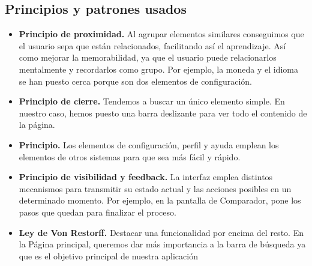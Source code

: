 \subsection{Principios y patrones usados}

\begin{itemize}

      \item \textbf{Principio de proximidad.} Al agrupar elementos similares conseguimos que el usuario sepa que están relacionados, facilitando así el aprendizaje. Así como mejorar la memorabilidad, ya que el usuario puede relacionarlos mentalmente y recordarlos como grupo.
            Por ejemplo, la moneda y el idioma se han puesto cerca porque son dos elementos de configuración.
      \item \textbf{Principio de cierre.} Tendemos a buscar un único elemento simple.
            En nuestro caso, hemos puesto una barra deslizante para ver todo el contenido de la página.
      \item \textbf{Principio.} Los elementos de configuración, perfil y ayuda emplean los elementos de otros sistemas para que sea más fácil y rápido.
      \item \textbf{Principio de visibilidad y feedback.} La interfaz emplea distintos mecanismos para transmitir su estado actual y las acciones posibles en un determinado momento.
            Por ejemplo, en la pantalla de Comparador, pone los pasos que quedan para finalizar el proceso.
      \item \textbf{Ley de Von Restorff.} Destacar una funcionalidad por encima del resto.
            En la Página principal, queremos dar más importancia a la barra de búsqueda ya que es el objetivo principal de nuestra aplicación

\end{itemize}
